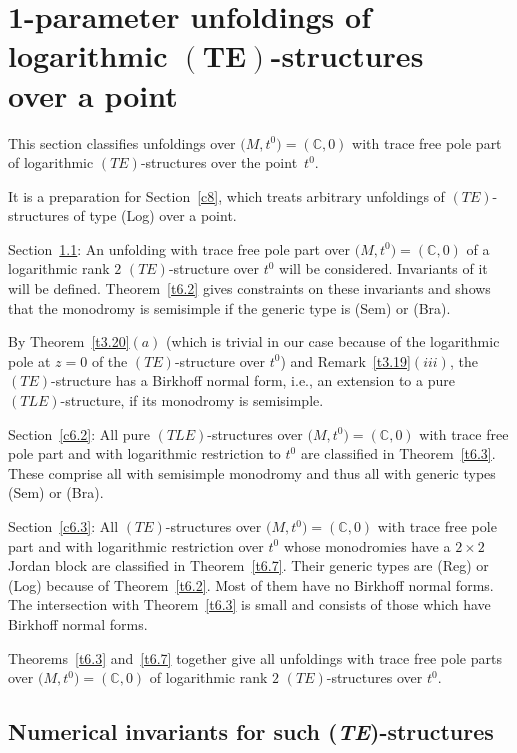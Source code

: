 \documentclass[pdftex]{sigma}%
\numberwithin{equation}{section}
\numberwithin{figure}{section}
\newcommand{\C}{{\mathbb C}}
\begin{document}
\section[1-parameter unfoldings of logarithmic $(TE)$-structuresover a point]
{1-parameter unfoldings of logarithmic $\boldsymbol{(TE)}$-structures \\over a point}\label{c6}

This section classifies unfoldings over $\big(M,t^0\big)=(\C,0)$
with trace free pole part
of logarithmic $(TE)$-structures over the point~$t^0$.

It is a preparation for Section~\ref{c8},
which treats arbitrary unfoldings of $(TE)$-structures
of type (Log) over a point.

Section~\ref{c6.1}: An unfolding with trace free pole part
over $\big(M,t^0\big)=(\C,0)$ of a logarithmic rank $2$ $(TE)$-structure
over $t^0$ will be considered. Invariants of it will
be defined. Theorem~\ref{t6.2} gives constraints on these
invariants and shows that the monodromy is
semisimple if the generic type is (Sem) or (Bra).

By Theorem~\ref{t3.20}$(a)$ (which is trivial in our case
because of the logarithmic pole at $z=0$ of the $(TE)$-structure
over $t^0$) and Remark~\ref{t3.19}$(iii)$,
the $(TE)$-structure has a Birkhoff normal form,
i.e., an extension to a pure $(TLE)$-structure,
if its monodromy is semisimple.

Section~\ref{c6.2}: All pure $(TLE)$-structures over
$\big(M,t^0\big)=(\C,0)$ with trace free pole part and with
logarithmic restriction to $t^0$ are classified
in Theorem~\ref{t6.3}. These comprise all with
semisimple monodromy and thus all with generic
types (Sem) or (Bra).

Section~\ref{c6.3}: All $(TE)$-structures
over $\big(M,t^0\big)=(\C,0)$ with trace free pole part and
with logarithmic restriction over $t^0$ whose
monodromies have a $2\times 2$ Jordan block
are classified in Theorem~\ref{t6.7}.
Their generic types are (Reg) or (Log) because of
Theorem~\ref{t6.2}.
Most of them have no Birkhoff normal forms.
The intersection with Theorem~\ref{t6.3} is small
and consists of those which have Birkhoff normal forms.

Theorems~\ref{t6.3} and~\ref{t6.7} together give
all unfoldings with trace free pole parts
over $\big(M,t^0\big)=(\C,0)$ of logarithmic rank $2$
$(TE)$-structures over $t^0$.





\subsection{Numerical invariants for such (\emph{TE})-structures}
\label{c6.1}
\end{document}
